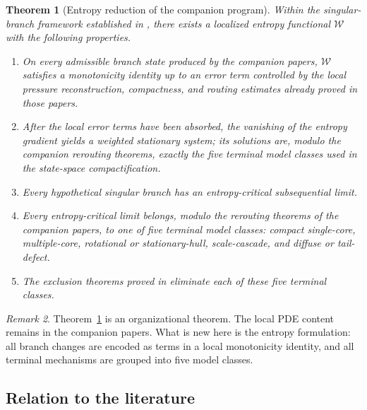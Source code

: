 \documentclass[11pt]{amsart}
\numberwithin{equation}{section}
\theoremstyle{plain}
\newtheorem{theorem}{Theorem}[section]
\theoremstyle{definition}
\theoremstyle{remark}
\newtheorem{remark}[theorem]{Remark}
\newcommand{\Wloc}{\mathcal W}
\begin{document}
\begin{theorem}[Entropy reduction of the companion program]
\label{thm:intro-main}
Within the singular-branch framework established in
\cite{BallesterSetup,BallesterResidual,BallesterTypeII}, there exists a
localized entropy functional \(\Wloc\) with the following properties.
\begin{enumerate}[label=\textup{(\roman*)},leftmargin=2.2em]
	\item On every admissible branch state produced by the companion papers,
	\(\Wloc\) satisfies a monotonicity identity up to an error term controlled by
	the local pressure reconstruction, compactness, and routing estimates already
	proved in those papers.
	\item After the local error terms have been absorbed, the vanishing of the
	entropy gradient yields a weighted stationary system; its solutions are,
	modulo the companion rerouting theorems, exactly the five terminal model
	classes used in the state-space compactification.
	\item Every hypothetical singular branch has an entropy-critical
	subsequential limit.
	\item Every entropy-critical limit belongs, modulo the rerouting theorems of
	the companion papers, to one of five terminal model classes:
	compact single-core, multiple-core, rotational or stationary-hull,
	scale-cascade, and diffuse or tail-defect.
	\item The exclusion theorems proved in
	\cite{BallesterSetup,BallesterResidual,BallesterTypeII} eliminate each of
	these five terminal classes.
\end{enumerate}
\end{theorem}

\begin{remark}
Theorem~\ref{thm:intro-main} is an organizational theorem.  The local PDE
content remains in the companion papers.  What is new here is the entropy
formulation: all branch changes are encoded as terms in a local monotonicity
identity, and all terminal mechanisms are grouped into five model classes.
\end{remark}

\subsection*{Relation to the literature}
\end{document}
